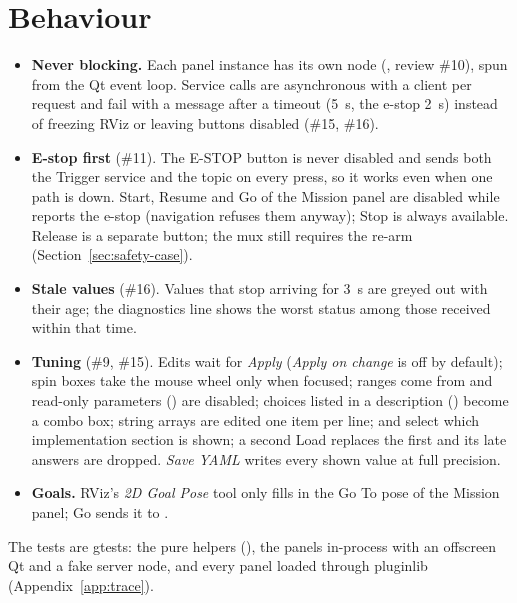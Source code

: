 \section{Behaviour}

\begin{itemize}
  \item \textbf{Never blocking.} Each panel instance has its own node
    (, review \#10), spun from the Qt event loop. Service
    calls are asynchronous with a client per request and fail with a message after a timeout
    (5~s, the e-stop 2~s) instead of freezing RViz or leaving buttons disabled (\#15, \#16).
  \item \textbf{E-stop first} (\#11). The E-STOP button is never disabled and sends both the
    Trigger service and the  topic on every press, so it works even
    when one path is down. Start, Resume and Go of the Mission panel are disabled while
     reports the e-stop (navigation refuses them anyway); Stop is always
    available. Release is a separate button; the mux still requires the re-arm
    (Section~\ref{sec:safety-case}).
  \item \textbf{Stale values} (\#16). Values that stop arriving for 3~s are greyed out with their
    age; the diagnostics line shows the worst status among those received within that time.
  \item \textbf{Tuning} (\#9, \#15). Edits wait for \emph{Apply} (\emph{Apply on change} is off by
    default); spin boxes take the mouse wheel only when focused; ranges come from
     and read-only parameters () are disabled; choices
    listed in a description () become a combo box; string arrays are edited one
    item per line;  and  select which implementation section is
    shown; a second Load replaces the first and its late answers are dropped. \emph{Save YAML}
    writes every shown value at full precision.
  \item \textbf{Goals.} RViz's \emph{2D Goal Pose} tool only fills in the Go To pose of the
    Mission panel; Go sends it to .
\end{itemize}

The tests are gtests: the pure helpers (), the panels in-process with an
offscreen Qt and a fake server node, and every panel loaded through pluginlib
(Appendix~\ref{app:trace}).
